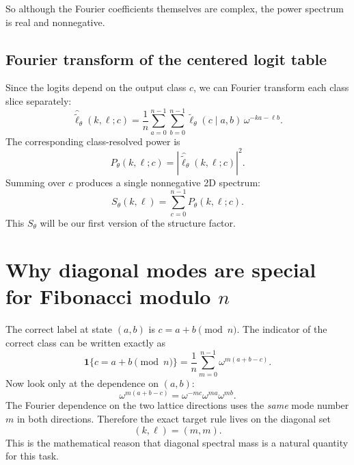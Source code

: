 \documentclass[11pt]{article}
\begin{document}
So although the Fourier coefficients themselves are complex, the power spectrum is real and nonnegative.

\subsection{Fourier transform of the centered logit table}

Since the logits depend on the output class $c$, we can Fourier transform each class slice separately:
\begin{equation}
    \widehat{\widetilde{\ell}}_\theta(k,\ell;c)
    = \frac{1}{n} \sum_{a=0}^{n-1}\sum_{b=0}^{n-1}
    \widetilde{\ell}_\theta(c \mid a,b)\, \omega^{-ka-\ell b}.
\end{equation}
The corresponding class-resolved power is
\begin{equation}
    P_\theta(k,\ell;c) = \left| \widehat{\widetilde{\ell}}_\theta(k,\ell;c) \right|^2.
\end{equation}
Summing over $c$ produces a single nonnegative 2D spectrum:
\begin{equation}
    S_\theta(k,\ell) = \sum_{c=0}^{n-1} P_\theta(k,\ell;c).
\end{equation}
This $S_\theta$ will be our first version of the structure factor.

\section{Why diagonal modes are special for Fibonacci modulo $n$}

The correct label at state $(a,b)$ is $c=a+b \pmod n$. The indicator of the correct class can be written exactly as
\begin{equation}
    \mathbf{1}\{c = a+b \pmod n\}
    = \frac{1}{n} \sum_{m=0}^{n-1} \omega^{m(a+b-c)}.
\end{equation}
Now look only at the dependence on $(a,b)$:
\begin{equation}
    \omega^{m(a+b-c)} = \omega^{-mc} \omega^{ma} \omega^{mb}.
\end{equation}
The Fourier dependence on the two lattice directions uses the \emph{same} mode number $m$ in both directions. Therefore the exact target rule lives on the diagonal set
\begin{equation}
    (k,\ell) = (m,m).
\end{equation}
This is the mathematical reason that diagonal spectral mass is a natural quantity for this task.
\end{document}
